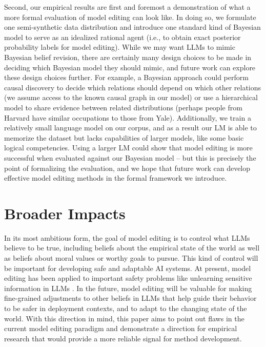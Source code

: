 \documentclass[11pt,a4paper]{article}
\begin{document}
Second, our empirical results are first and foremost a demonstration of what a more formal evaluation of model editing can look like. In doing so, we formulate one semi-synthetic data distribution and introduce one standard kind of Bayesian model to serve as an idealized rational agent (i.e., to obtain exact posterior probability labels for model editing). While we may want LLMs to mimic Bayesian belief revision, there are certainly many design choices to be made in deciding which Bayesian model they should mimic, and future work can explore these design choices further. For example, a Bayesian approach could perform causal discovery to decide which relations should depend on which other relations (we assume access to the known causal graph in our model) or use a hierarchical model to share evidence between related distributions (perhaps people from Harvard have similar occupations to those from Yale). Additionally, we train a relatively small language model on our corpus, and as a result our LM is able to memorize the dataset but lacks capabilities of larger models, like some basic logical competencies. Using a larger LM could show that model editing is more successful when evaluated against our Bayesian model -- but this is precisely the point of formalizing the evaluation, and we hope that future work can develop effective model editing methods in the formal framework we introduce. 

\vspace{-0.25em}
\section*{Broader Impacts}
\vspace{-0.25em}

In its most ambitious form, the goal of model editing is to control what LLMs believe to be true, including beliefs about the empirical state of the world as well as beliefs about moral values or worthy goals to pursue. This kind of control will be important for developing safe and adaptable AI systems. At present, model editing has been applied to important safety problems like unlearning sensitive information in LLMs \citep{patil2023can, li2024wmdp}. In the future, model editing will be valuable for making fine-grained adjustments to other beliefs in LLMs that help guide their behavior to be safer in deployment contexts, and to adapt to the changing state of the world. With this direction in mind, this paper aims to point out flaws in the current model editing paradigm and demonstrate a direction for empirical research that would provide a more reliable signal for method development.
\end{document}
